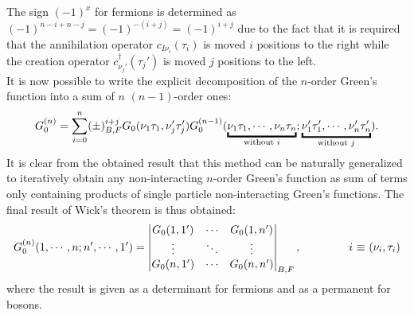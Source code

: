 The sign $(-1)^x$ for fermions is determined as $(-1)^{n-i+n-j}=(-1)^{-(i+j)}=(-1)^{i+j}$ due to the fact that it is required that the annihilation operator $c_{I\nu_i}(\tau_i)$ 
is moved $i$ positions to the right while the creation operator $c^\dagger_{\nu_j'}(\tau_j')$ is moved $j$ positions to the left.\\
It is now possible to write the explicit decomposition of the $n$-order Green's function into a sum of $n$ $(n-1)$-order ones:
\begin{equation}
    G_0^{(n)}=\sum_{i=0}^{n}(\pm)^{i+j}_{B,F}G_0(\nu_1\tau_1,\nu_j'\tau_j')G_0^{(n-1)}(\underbracket[1.5pt][3pt]{\nu_1\tau_1,\cdots,\nu_n\tau_n}_{\mathclap{\text{without $i$}}};\underbracket[1.5pt][3pt]{\nu_1'\tau_1',\cdots,\nu_n'\tau_n'}_{\mathclap{\text{without $j$}}}).
\end{equation}
It is clear from the obtained result that this method can be naturally generalized to iteratively obtain any non-interacting $n$-order Green's function as sum of terms only 
containing products of single particle non-interacting Green's functions. The final result of Wick's theorem is thus obtained:
\begin{equation}
    G_0^{(n)}(1,\cdots,n;n',\cdots,1')=\begin{vmatrix}
        G_0(1,1') & \cdots & G_0(1,n') \\
        \vdots & \ddots & \vdots \\
        G_0(n,1') & \cdots & G_0(n,n') \\
    \end{vmatrix}_{B,F},\hspace{1.5cm}\text{$i$ $\equiv$ $(\nu_i,\tau_i)$}
\end{equation}
where the result is given as a determinant for fermions and as a permanent for bosons.
